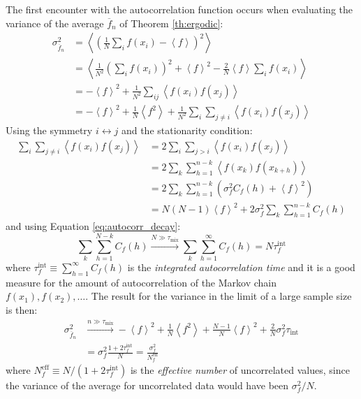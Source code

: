 The first encounter with the autocorrelation function occurs when evaluating the variance of the average $\overline f_n$ of Theorem \ref{th:ergodic}:
\begin{align*}
    \sigma_{\overline f_n}^2 &= \left<\left(\frac{1}{N}\sum_if(x_i) - \left<f\right>\right)^2\right> \\
                             &= \left<\frac{1}{N^2}\left(\sum_if(x_i)\right)^2 +\left<f\right>^2 -\frac{2}{N}\left<f\right>\sum_if(x_i)\right> \\
                             &= -\left<f\right>^2 + \frac{1}{N^2}\sum_{ij}\left<f(x_i)f(x_j)\right> \\
                             &= -\left<f\right>^2 + \frac{1}{N}\left<f^2\right> + \frac{1}{N^2}\sum_i\sum_{j \neq i}\left<f(x_i)f(x_j)\right>
\end{align*}
Using the symmetry $i \leftrightarrow j$ and the stationarity condition:
\begin{align*}
    \sum_i\sum_{j\neq i}\left<f(x_i)f(x_j)\right> &= 2\sum_i\sum_{j>i}\left<f(x_i)f(x_j)\right> \\
                                                  &= 2\sum_k\sum_{h=1}^{n-k}\left<f(x_k)f(x_{k+h})\right> \\
                                                  &= 2\sum_k\sum_{h=1}^{n-k}\left(\sigma_f^2C_f(h)+\left<f\right>^2\right) \\
                                                  &= N(N-1)\left<f\right>^2 + 2\sigma_f^2\sum_k\sum_{h=1}^{n-k}C_f(h)
\end{align*}
and using Equation \eqref{eq:autocorr_decay}:
\[
    \sum_k\sum_{h=1}^{N-k}C_f(h) \xrightarrow{N\gg\tau_\mathrm{mix}} \sum_k\sum_{h=1}^\infty C_f(h) = N\tau_f^\mathrm{int}
\]
where $\tau_f^\mathrm{int} \equiv \sum_{h=1}^\infty C_f(h)$ is the \emph{integrated autocorrelation time} and
it is a good measure for the amount of autocorrelation of the Markov chain $f(x_1), f(x_2), \ldots$.
The result for the variance in the limit of a large sample size is then:
\begin{equation}\label{eq:variance}\begin{aligned}
    \sigma_{\overline f_n}^2 &\xrightarrow{n\gg\tau_\mathrm{mix}}-\left<f\right>^2+\frac{1}{N}\left<f^2\right>+\frac{N-1}{N}\left<f\right>^2+\frac{2}{N}\sigma_f^2\tau_\mathrm{int} \\
                             &= \sigma_f^2\frac{1+2\tau_f^\mathrm{int}}{N} = \frac{\sigma_f^2}{N_f^\mathrm{eff}}
\end{aligned}\end{equation}
where $N_f^\mathrm{eff} \equiv N/(1+2\tau_f^\mathrm{int})$ is the \emph{effective number} of uncorrelated values,
since the variance of the average for uncorrelated data would have been $\sigma_f^2/N$.

